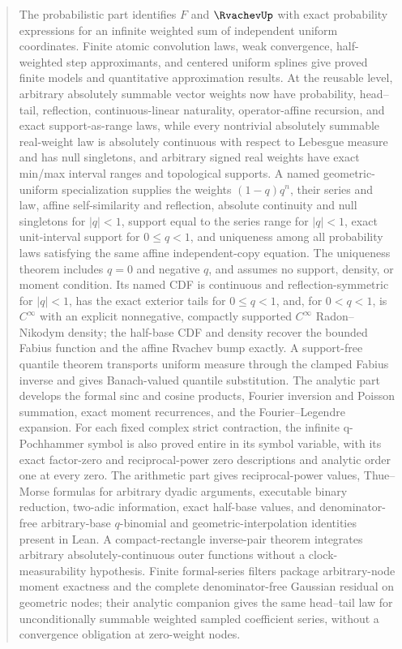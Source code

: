 \documentclass[11pt,oneside]{article}
\theoremstyle{definition}
\theoremstyle{remark}
\begin{document}
\begin{abstract}
The probabilistic part identifies $F$ and $\RvachevUp$ with exact probability expressions for an
infinite weighted sum of independent uniform coordinates.  Finite atomic convolution laws,
weak convergence, half-weighted step approximants, and centered uniform splines give proved
finite models and quantitative approximation results.  At the reusable level, arbitrary
absolutely summable vector weights now have probability, head--tail, reflection,
continuous-linear naturality, operator-affine recursion, and exact support-as-range laws,
while every nontrivial absolutely summable real-weight law is absolutely continuous with
respect to Lebesgue measure and has null singletons, and arbitrary signed real weights have
exact min/max interval ranges and topological supports.  A named geometric-uniform
specialization supplies the weights \((1-q)q^n\), their series and law, affine self-similarity
and reflection, absolute continuity and null singletons for \(|q|<1\), support equal to the
series range for \(|q|<1\), exact unit-interval support for \(0\le q<1\), and uniqueness
among all probability laws satisfying the same affine independent-copy equation.  The
uniqueness theorem includes \(q=0\) and negative \(q\), and assumes no support, density, or
moment condition.  Its named CDF is
continuous and reflection-symmetric for \(|q|<1\), has the exact exterior tails for
\(0\le q<1\), and, for \(0<q<1\), is \(C^\infty\) with an explicit nonnegative,
compactly supported \(C^\infty\) Radon--Nikodym density; the half-base CDF and density recover
the bounded Fabius function and the affine Rvachev bump exactly.  A support-free quantile
theorem transports uniform measure through
the clamped Fabius inverse and gives Banach-valued quantile substitution.  The analytic part develops the
formal sinc and cosine products, Fourier inversion and Poisson summation, exact moment
recurrences, and the Fourier--Legendre expansion.  For each fixed complex strict
contraction, the infinite q-Pochhammer symbol is
also proved entire in its symbol variable, with its exact factor-zero and
reciprocal-power zero descriptions and analytic order one at every zero.  The arithmetic
part gives reciprocal-power
values, Thue--Morse formulas for arbitrary dyadic arguments, executable binary reduction,
two-adic information, exact half-base values, and denominator-free arbitrary-base
$q$-binomial and geometric-interpolation identities present in Lean.  A compact-rectangle
inverse-pair theorem integrates arbitrary absolutely-continuous outer functions without a
clock-measurability hypothesis.  Finite formal-series filters package arbitrary-node
moment exactness and the complete denominator-free Gaussian residual on geometric nodes;
their analytic companion gives the same head--tail law for unconditionally summable
weighted sampled coefficient series, without a convergence obligation at zero-weight nodes.


\end{abstract}
\end{document}
